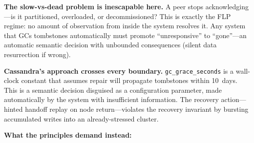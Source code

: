 \documentclass[11pt]{article}
\begin{document}
\textbf{The slow-vs-dead problem is inescapable here.} A peer stops
acknowledging---is it partitioned, overloaded, or decommissioned? This is
exactly the FLP regime: no amount of observation from inside the system resolves
it. Any system that GCs tombstones automatically must promote ``unresponsive''
to ``gone''---an automatic semantic decision with unbounded consequences (silent
data resurrection if wrong).

\textbf{Cassandra's approach crosses every boundary.}
\texttt{gc\_grace\_seconds} is a wall-clock constant that assumes repair will
propagate tombstones within 10~days. This is a semantic decision disguised as a
configuration parameter, made automatically by the system with insufficient
information. The recovery action---hinted handoff replay on node return---violates
the recovery invariant by bursting accumulated writes into an already-stressed
cluster.

\textbf{What the principles demand instead:}
\end{document}
